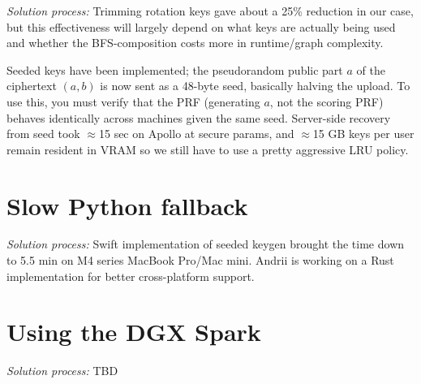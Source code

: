 \documentclass{article}
\begin{document}
\noindent{}
\vspace{0.3cm}

\textit{Solution process:} Trimming rotation keys gave about a 25\% reduction in our case, but this effectiveness will largely depend on what keys are actually being used and whether the BFS-composition costs more in runtime/graph complexity.

Seeded keys have been implemented; the pseudorandom public part $a$ of the ciphertext $(a, b)$ is now sent as a 48-byte seed, basically halving the upload.
To use this, you must verify that the PRF (generating $a$, not the scoring PRF) behaves identically across machines given the same seed.
Server-side recovery from seed took $\approx$15 sec on Apollo at secure params, and $\approx$15 GB keys per user remain resident in VRAM so we still have to use a pretty aggressive LRU policy.

\section{Slow Python fallback}

\noindent{}
\vspace{0.3cm}

\textit{Solution process:} Swift implementation of seeded keygen brought the time down to 5.5 min on M4 series MacBook Pro/Mac mini. Andrii is working on a Rust implementation for better cross-platform support.

\section{Using the DGX Spark}

\noindent{}
\vspace{0.3cm}

\textit{Solution process:} TBD
\end{document}
